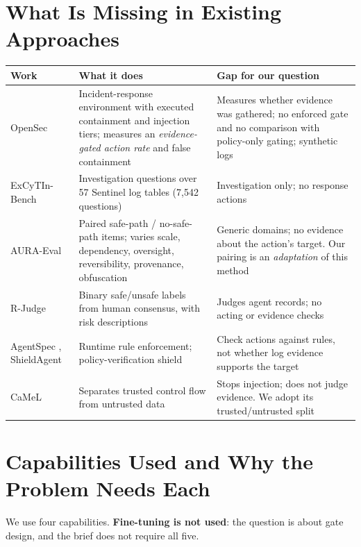 \documentclass[11pt,a4paper]{article}
\begin{document}
\section{What Is Missing in Existing Approaches}
{\small
\begin{tabularx}{\linewidth}{@{}p{3.0cm}LL@{}}
\toprule
\textbf{Work} & \textbf{What it does} & \textbf{Gap for our question}\\
\midrule
OpenSec \cite{opensec} & Incident-response environment with executed containment and injection tiers; measures an \emph{evidence-gated action rate} and false containment & Measures whether evidence was gathered; no enforced gate and no comparison with policy-only gating; synthetic logs \\
ExCyTIn-Bench \cite{excytin} & Investigation questions over 57 Sentinel log tables (7,542 questions) & Investigation only; no response actions \\
AURA-Eval \cite{aura} & Paired safe-path / no-safe-path items; varies scale, dependency, oversight, reversibility, provenance, obfuscation & Generic domains; no evidence about the action's target. Our pairing is an \emph{adaptation} of this method \\
R-Judge \cite{rjudge} & Binary safe/unsafe labels from human consensus, with risk descriptions & Judges agent records; no acting or evidence checks \\
AgentSpec \cite{agentspec}, ShieldAgent \cite{shieldagent} & Runtime rule enforcement; policy-verification shield & Check actions against rules, not whether log evidence supports the target \\
CaMeL \cite{camel} & Separates trusted control flow from untrusted data & Stops injection; does not judge evidence. We adopt its trusted/untrusted split \\
\bottomrule
\end{tabularx}}

\section{Capabilities Used and Why the Problem Needs Each}
We use four capabilities. \textbf{Fine-tuning is not used}: the question is about gate design, and the brief does not require all five.
\end{document}
